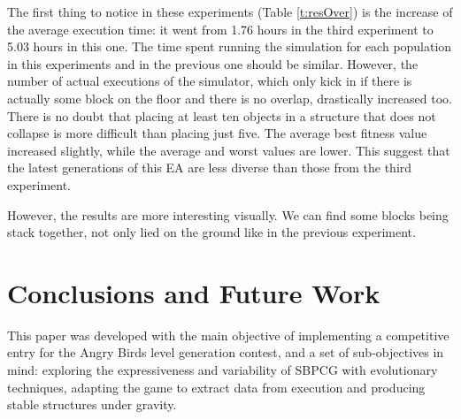\documentclass[runningheads,a4paper]{llncs}
\begin{document}
The first thing to notice in these experiments (Table \ref{t:resOver}) is the 
increase of the average execution time: it went from 1.76 hours in the third 
experiment to 5.03 hours in this one. The time spent running the simulation for 
each population in this experiments and in the previous one should be similar. 
However, the number of actual executions of the simulator, which only
kick in if there is actually some block on the floor and there is no overlap, drastically increased too. There is no doubt 
that placing at least ten objects in a structure that does not
collapse is more difficult than placing just five. The average 
best fitness value increased slightly, while the average and worst values are lower. This suggest that the latest generations of this EA are less diverse than those 
from the third experiment.

However, the results are more interesting visually. We can find some blocks 
being stack together, not only lied on the ground like in the previous 
experiment. 




%
\section{Conclusions and Future Work} 
\label{sec:conclusions}


This paper was developed with the main objective of implementing a
competitive entry for the Angry Birds level generation contest, and  a
set of sub-objectives in mind: exploring the expressiveness and variability of 
SBPCG with evolutionary techniques, adapting the game to extract data from 
execution and producing stable structures under gravity.
\end{document}
